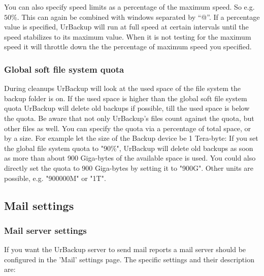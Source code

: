 \documentclass[a4paper,10pt]{article}
\begin{document}
You can also specify speed limits as a percentage of the maximum speed. So e.g. $50\%$. This can again be combined with windows separated by ``@''. If a percentage value is specified, UrBackup will run at full speed at certain intervals until the speed stabilizes to its maximum value. When it is not testing for the maximum speed it will throttle down the the percentage of maximum speed you specified.
 
\subsubsection{Global soft file system quota}
\label{global_soft_fs_quota}

During cleanups UrBackup will look at the used space of the file system the backup folder is on. If the used space is higher than the global soft file system quota UrBackup will delete old backups if possible, till the used space is below the quota. Be aware that not only UrBackup's files count against the quota, but other files as well.
You can specify the quota via a percentage of total space, or by a size. For example let the size of the Backup device be 1 Tera-byte:
If you set the global file system quota to "90\%", UrBackup will delete old backups as soon as more than about 900 Giga-bytes of the available space is used. You could also directly set the quota to 900 Giga-bytes by setting it to "900G". Other units are possible, e.g. "900000M" or "1T".

\subsection{Mail settings}

\subsubsection{Mail server settings}
\label{mail_server_settings}

If you want the UrBackup server to send mail reports a mail server should be configured in the 'Mail' settings page. The specific settings and their description are:
\end{document}

